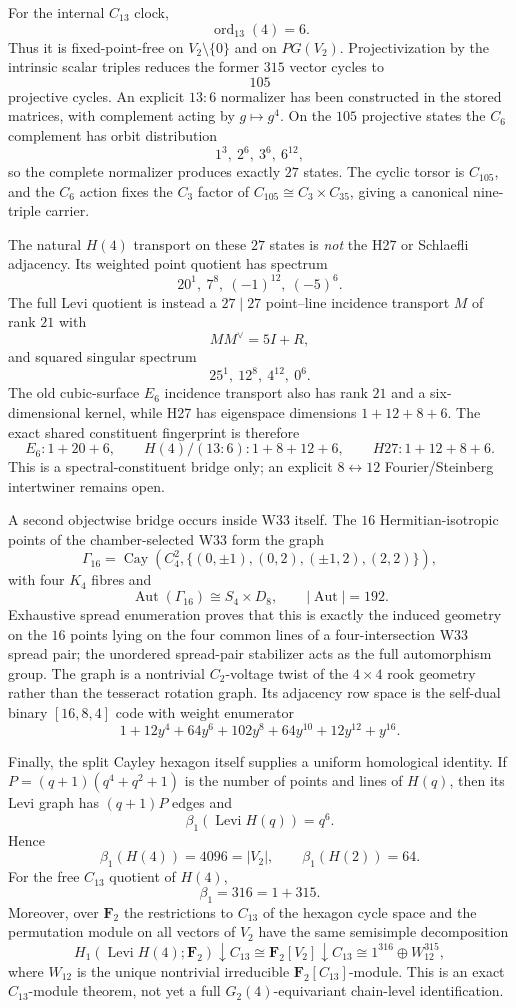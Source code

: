 For the internal $C_{13}$ clock,
\[
 \operatorname{ord}_{13}(4)=6.
\]
Thus it is fixed-point-free on $V_2\setminus\{0\}$ and on $PG(V_2)$.  Projectivization by the intrinsic scalar triples reduces the former $315$ vector cycles to
\[
 \boxed{105}
\]
projective cycles.  An explicit $13{:}6$ normalizer has been constructed in the stored matrices, with complement acting by $g\mapsto g^4$.  On the $105$ projective states the $C_6$ complement has orbit distribution
\[
 1^3,\ 2^6,\ 3^6,\ 6^{12},
\]
so the complete normalizer produces exactly $27$ states.  The cyclic torsor is $C_{105}$, and the $C_6$ action fixes the $C_3$ factor of $C_{105}\cong C_3\times C_{35}$, giving a canonical nine-triple carrier.

The natural $H(4)$ transport on these $27$ states is \emph{not} the H27 or Schlaefli adjacency.  Its weighted point quotient has spectrum
\[
 20^1,\ 7^8,\ (-1)^{12},\ (-5)^6.
\]
The full Levi quotient is instead a $27\mid27$ point--line incidence transport $M$ of rank $21$ with
\[
 M M^\vee=5I+R,
\]
and squared singular spectrum
\[
 25^1,\ 12^8,\ 4^{12},\ 0^6.
\]
The old cubic-surface $E_6$ incidence transport also has rank $21$ and a six-dimensional kernel, while H27 has eigenspace dimensions $1+12+8+6$.  The exact shared constituent fingerprint is therefore
\[
 E_6:1+20+6,
 \qquad H(4)/(13{:}6):1+8+12+6,
 \qquad H27:1+12+8+6.
\]
This is a spectral-constituent bridge only; an explicit $8\leftrightarrow12$ Fourier/Steinberg intertwiner remains open.

A second objectwise bridge occurs inside W33 itself.  The $16$ Hermitian-isotropic points of the chamber-selected W33 form the graph
\[
 \Gamma_{16}=\operatorname{Cay}\!\left(C_4^2,\{(0,\pm1),(0,2),(\pm1,2),(2,2)\}\right),
\]
with four $K_4$ fibres and
\[
 \operatorname{Aut}(\Gamma_{16})\cong S_4\times D_8,
 \qquad |\operatorname{Aut}|=192.
\]
Exhaustive spread enumeration proves that this is exactly the induced geometry on the $16$ points lying on the four common lines of a four-intersection W33 spread pair; the unordered spread-pair stabilizer acts as the full automorphism group.  The graph is a nontrivial $C_2$-voltage twist of the $4\times4$ rook geometry rather than the tesseract rotation graph.  Its adjacency row space is the self-dual binary $[16,8,4]$ code with weight enumerator
\[
 1+12y^4+64y^6+102y^8+64y^{10}+12y^{12}+y^{16}.
\]

Finally, the split Cayley hexagon itself supplies a uniform homological identity.  If $P=(q+1)(q^4+q^2+1)$ is the number of points and lines of $H(q)$, then its Levi graph has $(q+1)P$ edges and
\[
 \boxed{\beta_1(\operatorname{Levi}H(q))=q^6}.
\]
Hence
\[
 \beta_1(H(4))=4096=|V_2|,
 \qquad
 \beta_1(H(2))=64.
\]
For the free $C_{13}$ quotient of $H(4)$,
\[
 \beta_1=316=1+315.
\]
Moreover, over $\mathbf F_2$ the restrictions to $C_{13}$ of the hexagon cycle space and the permutation module on all vectors of $V_2$ have the same semisimple decomposition
\[
 H_1(\operatorname{Levi}H(4);\mathbf F_2)\downarrow C_{13}
 \cong
 \mathbf F_2[V_2]\downarrow C_{13}
 \cong 1^{316}\oplus W_{12}^{315},
\]
where $W_{12}$ is the unique nontrivial irreducible $\mathbf F_2[C_{13}]$-module.  This is an exact $C_{13}$-module theorem, not yet a full $G_2(4)$-equivariant chain-level identification.
